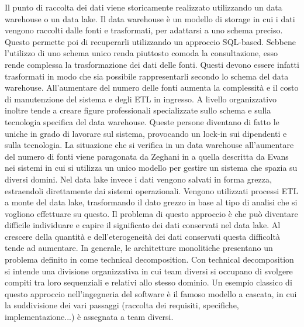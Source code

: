 \documentclass[12pt]{report}
\begin{document}
Il punto di raccolta dei dati viene storicamente realizzato utilizzando un data warehouse o un data lake. 
Il data warehouse è un modello di storage in cui i dati vengono raccolti dalle fonti e trasformati, per adattarsi a uno schema preciso. 
Questo permette poi di recuperarli utilizzando un approccio SQL-based. 
Sebbene l'utilizzo di uno schema unico renda piuttosto comoda la consultazione, esso rende complessa la trasformazione dei dati delle fonti.
Questi devono essere infatti trasformati in modo che sia possibile rappresentarli secondo lo schema del data warehouse.
All'aumentare del numero delle fonti aumenta la complessità e il costo di manutenzione del sistema e degli ETL in ingresso.
A livello organizzativo inoltre tende a creare figure professionali specializzate sullo schema e sulla tecnologia specifica del data warehouse. 
Queste persone diventano di fatto le uniche in grado di lavorare sul sistema, provocando un lock-in sui dipendenti e sulla tecnologia.
La situazione che si verifica in un data warehouse all'aumentare del numero di fonti viene paragonata da Zeghani in \cite{dehghani_data_2022} a quella descritta da Evans nei sistemi in cui si utilizza un unico modello per gestire un sistema che spazia su diversi domini.
Nel data lake invece i dati vengono salvati in forma grezza, estraendoli direttamente dai sistemi operazionali.
Vengono utilizzati processi ETL a monte del data lake, trasformando il dato grezzo in base al tipo di analisi che si vogliono effettuare su questo.
Il problema di questo approccio è che può diventare difficile individuare e capire il significato dei dati conservati nel data lake.
Al crescere della quantità e dell'eterogeneità dei dati conservati questa difficoltà tende ad aumentare.
In generale, le architetture monolitiche presentano un problema definito in \cite{perry_foundations_1992} come technical decomposition.
Con  technical decomposition si intende una divisione organizzativa in cui team diversi si occupano di svolgere compiti tra loro sequenziali e relativi allo stesso dominio.
Un esempio classico di questo approccio nell'ingegneria del software è il famoso modello a cascata, in cui la suddivisione dei vari passaggi (raccolta dei requisiti, specifiche, implementazione...) è assegnata a team diversi.
\end{document}
